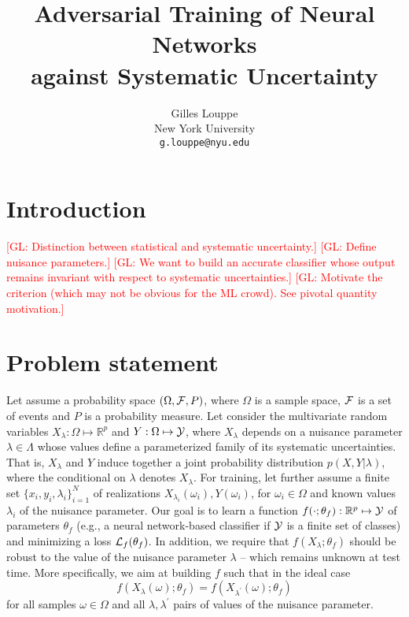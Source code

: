 \documentclass{article}
\title{Adversarial Training of Neural Networks\\
against Systematic Uncertainty}
\author{
  Gilles Louppe \\
  New York University\\
  \texttt{g.louppe@nyu.edu} \\
}
\newcommand{\glnote}[1]{\textcolor{red}{[GL: #1]}}
\theoremstyle{plain}
\begin{document}

\maketitle

\begin{abstract}
\end{abstract}

\section{Introduction}

\glnote{Distinction between statistical and systematic uncertainty.}
\glnote{Define nuisance parameters.}
\glnote{We want to build an accurate classifier whose output remains invariant with
respect to systematic uncertainties.}
\glnote{Motivate the criterion (which may not be obvious for the ML crowd). See pivotal quantity motivation.}



\section{Problem statement}
\label{sec:problem}

Let assume a probability space $(\Omega, {\cal F}, P)$, where $\Omega$ is a
sample space, ${\cal F}$ is a set of events and $P$ is a probability measure.
Let consider the multivariate random variables $X_\lambda: \Omega \mapsto
\mathbb{R}^p$ and $Y: \Omega \mapsto {\cal Y}$, where $X_\lambda$ depends on a
nuisance parameter $\lambda \in \Lambda$ whose values define a
parameterized family of its systematic uncertainties. That is, $X_\lambda$ and
$Y$ induce together a joint probability distribution $p(X,Y|\lambda)$, where the
conditional on $\lambda$ denotes $X_\lambda$. For training, let further assume a
finite set $\{ x_i, y_i, \lambda_i \}_{i=1}^N$ of realizations
$X_{\lambda_i}(\omega_i), Y(\omega_i)$, for $\omega_i \in \Omega$ and known
values $\lambda_i$ of the nuisance parameter. Our goal is to learn a function
$f(\cdot;\theta_f) : \mathbb{R}^p \mapsto {\cal Y}$ of parameters $\theta_f$
(e.g., a neural network-based classifier if ${\cal Y}$ is a finite set of
classes) and minimizing  a loss ${\cal L}_f(\theta_f)$. In addition, we require
that $f(X_\lambda ; \theta_f)$ should be robust to the value of the nuisance parameter $\lambda$ --
which remains unknown at test time. More specifically, we aim at building $f$
such that in the ideal case
\begin{equation}\label{eqn:criterion-true}
f(X_{\lambda}(\omega) ; \theta_f) = f(X_{\lambda^\prime}(\omega) ; \theta_f)
\end{equation} for all
samples $\omega \in \Omega$ and all $\lambda, \lambda^\prime$ pairs of values of the
nuisance parameter.
\end{document}

